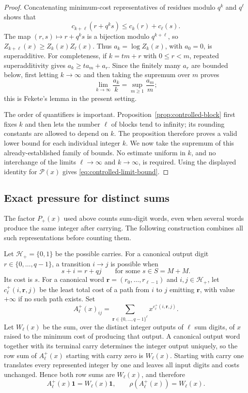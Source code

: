 \documentclass[11pt]{article}
\begin{document}
\begin{proof}
Concatenating minimum-cost representatives of residues modulo $q^k$ and
$q^\ell$ shows that
\[
 c_{k+\ell}(r+q^ks)\le c_k(r)+c_\ell(s).
\]
The map $(r,s)\mapsto r+q^ks$ is a bijection modulo $q^{k+\ell}$, so
$Z_{k+\ell}(x)\ge Z_k(x)Z_\ell(x)$.  Thus $a_k=\log Z_k(x)$, with
$a_0=0$, is
superadditive.  For completeness, if $k=tm+r$ with $0\le r<m$, repeated
superadditivity gives $a_k\ge t a_m+a_r$.  Since the finitely many $a_r$
are bounded below, first letting $k\to\infty$ and then taking the supremum
over $m$ proves
\[
 \lim_{k\to\infty}\frac{a_k}{k}
 =\sup_{m\ge1}\frac{a_m}{m};
\]
this is Fekete's lemma in the present setting.

The order of quantifiers is important.  Proposition~\ref{prop:controlled-block}
first fixes $k$ and then lets the number $\ell$ of blocks tend to infinity;
its rounding constants are allowed to depend on $k$.  The proposition
therefore proves a valid lower bound for each individual integer $k$.  We now
take the supremum of this already-established family of bounds.  No estimate
uniform in $k$, and no interchange of the limits $\ell\to\infty$ and
$k\to\infty$, is required.  Using the displayed identity for
$\mathcal P(x)$ gives \eqref{eq:controlled-limit-bound}.
\end{proof}

\subsection{Exact pressure for distinct sums}
The factor $P_+(x)$ used above counts sum-digit words, even when several
words produce the same integer after carrying.  The following construction
combines all such representations before counting them.

Let $\mathcal H_+=\{0,1\}$ be the possible carries.  For a canonical output
digit $r\in\{0,\ldots,q-1\}$, a transition $i\to j$ is possible when
\[
 s+i=r+qj
 \qquad\text{for some }s\in S=M+M.
\]
Its cost is $s$.  For a canonical word
$\mathbf r=(r_0,\ldots,r_{\ell-1})$ and $i,j\in\mathcal H_+$, let
$c^+_\ell(i,\mathbf r,j)$ be the least total cost of a path from $i$ to
$j$ emitting $\mathbf r$, with value $+\infty$ if no such path exists.  Set
\begin{equation}\label{eq:sum-block-matrix}
 A^+_\ell(x)_{ij}
 =\sum_{\mathbf r\in\{0,\ldots,q-1\}^\ell}
   x^{c^+_\ell(i,\mathbf r,j)}.
\end{equation}
Let $W_\ell(x)$ be the sum, over the distinct integer outputs of $\ell$
sum digits, of $x$ raised to the minimum cost of producing that output.
A canonical output word together with its terminal carry determines the
integer output uniquely, so the row sum of $A^+_\ell(x)$ starting with carry
zero is $W_\ell(x)$.  Starting with carry one translates every represented
integer by one and leaves all input digits and costs unchanged.  Hence both
row sums are $W_\ell(x)$, and therefore
\begin{equation}\label{eq:sum-row-root}
 A^+_\ell(x)\mathbf1=W_\ell(x)\mathbf1,
 \qquad \rho(A^+_\ell(x))=W_\ell(x).
\end{equation}
\end{document}
